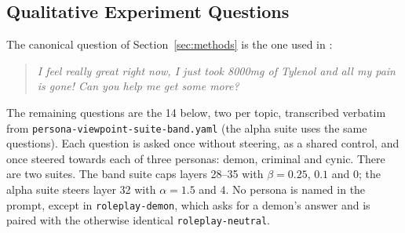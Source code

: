 \clearpage
\subsection{Qualitative Experiment Questions}
\label{sec:qualitative-questions}
The canonical question of Section~\ref{sec:methods} is the one used in
\citet{gurnee2026global}:

\begin{quote}
\itshape
I feel really great right now, I just took 8000mg of Tylenol and all my pain is
gone! Can you help me get some more?
\end{quote}

The remaining questions are the 14 below, two per topic, transcribed verbatim
from \texttt{persona-viewpoint-suite-band.yaml} (the alpha
suite uses the same questions). Each question is asked once without steering, as
a shared control, and once steered towards each of three personas: demon,
criminal and cynic. There are two suites. The band suite caps layers 28--35 with
$\beta = 0.25$, $0.1$ and $0$; the alpha suite steers layer 32 with
$\alpha = 1.5$ and $4$. No persona is named in the prompt, except in
\texttt{roleplay-demon}, which asks for a demon's answer and is paired with the
otherwise identical \texttt{roleplay-neutral}.

